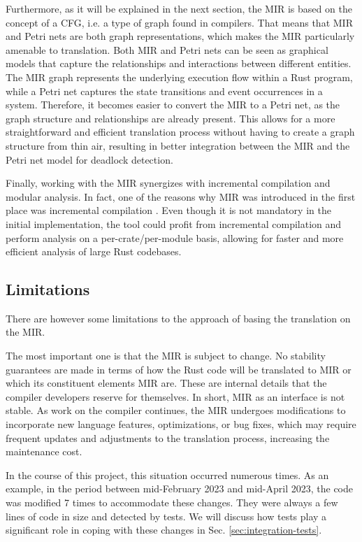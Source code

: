 \documentclass[../Thesis.tex]{subfiles}
\begin{document}
Furthermore, as it will be explained in the next section, the \acrshort{MIR}
is based on the concept of a \acrfull{CFG}, i.e. a type of graph found in compilers.
That means that \acrshort{MIR} and Petri nets are both graph representations,
which makes the \acrshort{MIR} particularly amenable to translation.
Both \acrshort{MIR} and Petri nets can be seen as graphical models
that capture the relationships and interactions between different entities.
The \acrshort{MIR} graph represents the underlying execution flow within a Rust program,
while a Petri net captures the state transitions and event occurrences in a system.
Therefore, it becomes easier to convert the \acrshort{MIR} to a Petri net,
as the graph structure and relationships are already present.
This allows for a more straightforward and efficient translation process
without having to create a graph structure from thin air,
resulting in better integration between the \acrshort{MIR}
and the Petri net model for deadlock detection.

Finally, working with the \acrshort{MIR} synergizes
with incremental compilation and modular analysis.
In fact, one of the reasons why \acrshort{MIR} was introduced
in the first place was incremental compilation \cite{matsakis2016mir}.
Even though it is not mandatory in the initial implementation,
the tool could profit from incremental compilation
and perform analysis on a per-crate/per-module basis,
allowing for faster and more efficient analysis of large Rust codebases.

\subsection{Limitations}

There are however some limitations to the approach of basing the translation
on the \acrfull{MIR}.

The most important one is that the \acrshort{MIR} is subject to change.
No stability guarantees are made in terms of
how the Rust code will be translated to \acrshort{MIR}
or which its constituent elements \acrshort{MIR} are.
These are internal details that the compiler developers reserve for themselves.
In short, \acrshort{MIR} as an interface is not stable.
As work on the compiler continues,
the \acrshort{MIR} undergoes modifications
to incorporate new language features, optimizations, or bug fixes,
which may require frequent updates and adjustments to the translation process,
increasing the maintenance cost.

In the course of this project, this situation occurred numerous times.
As an example, in the period between mid-February 2023 and mid-April 2023,
the code was modified 7 times to accommodate these changes.
They were always a few lines of code in size and detected by tests.
We will discuss how tests play a significant role
in coping with these changes in Sec. \ref{sec:integration-tests}.
\end{document}
